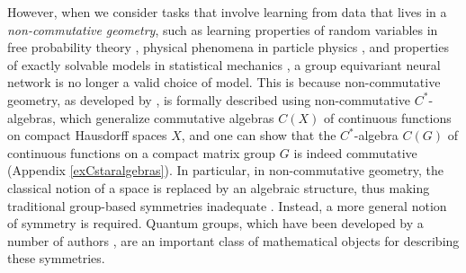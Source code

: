 \documentclass{article}
\theoremstyle{plain}
\theoremstyle{definition}
\theoremstyle{remark}
\begin{document}
However, when we consider tasks that involve learning from data that lives in a
\textit{non-commutative geometry},
such as 
learning 
properties of random variables in free probability theory
\citep{voiculescu1985, voiculescu1992},
physical phenomena in particle physics \citep{bhowmick2014, vansuijlekom2014},
and properties of exactly solvable models in statistical mechanics \citep{podles1995},
a group equivariant neural network is no longer a valid choice of model.
This is because
non-commutative geometry, as developed by \citet{Connes1995},
is formally described using non-commutative $C^{*}$-algebras,
which generalize commutative algebras $C(X)$
of continuous functions on compact Hausdorff spaces $X$,
and one can show that the $C^{*}$-algebra $C(G)$ of continuous functions 
on a compact matrix group $G$
is indeed commutative 
(Appendix \ref{exCstaralgebras}). 
In particular, in non-commutative geometry,
the classical notion of a space is replaced by an algebraic structure, 
thus making
traditional group-based symmetries inadequate 
\citep{Budzyński1995, Majid2000, Sitarz2013}.
Instead, a more general notion of symmetry is required.
Quantum groups, which have been developed by a number of authors 
\citep{Jimbo1985, drinfeld1986, woronowicz1987, woronowicz1991, woronowicz1998},
are an important class of mathematical objects for describing these symmetries.
\end{document}
